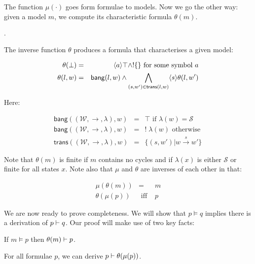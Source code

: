 The function $\mu(\cdot)$ goes form formulae to models. Now we go the
other way: given a model $m$, we compute its characteristic formula
$\theta(m)$. 


 \cite{AcetoL:chaforfata}.


\NI The inverse function $\theta$ produces a formula that
characterises a given model:

\begin{eqnarray*}
\theta(\bot) & = & \langle a \rangle \top \land ! \{ \} \mbox{ for some symbol }a  \\
\theta(l, w) & = & \mathsf{bang}(l,w) \land \bigwedge_{(s,w') \in \mathsf{trans}(l,w)} \langle s \rangle \theta(l, w')  
\end{eqnarray*}


\NI Here:

\begin{eqnarray*}
\mathsf{bang}((\mathcal{W},\rightarrow,\lambda),w) & = & \top \mbox{ if } \lambda(w) = \mathcal{S}  \\
\mathsf{bang}((\mathcal{W},\rightarrow,\lambda),w) & = & ! \; \lambda(w) \mbox{ otherwise }  \\
\mathsf{trans}((\mathcal{W},\rightarrow, \lambda),w) & = & \{(s,w') | w \xrightarrow{s} w' \} 
\end{eqnarray*}

\NI Note that $\theta(m)$ is finite if $m$ contains no cycles and if
$\lambda(x)$ is either $\mathcal{S}$ or finite for all states $x$.
Note also that $\mu$ and $\theta$ are inverses of each other in that:

\begin{eqnarray*}
\mu(\theta(m)) & = & m  \\
\theta(\mu(p)) & \mbox{ iff } & p 
\end{eqnarray*}

\NI We are now ready to prove completeness.  We will show that $p
\models q$ implies there is a derivation of $p \vdash q$.  Our proof
will make use of two key facts:

\begin{lemma}\label{lemma:completeness:4}
If $m \models p$ then $\theta(m) \vdash p$.
\end{lemma}

\begin{lemma}\label{lemma:completeness:5}
For all formulae $p$, we can derive $p \vdash \theta(\mu(p))$.
\end{lemma}

